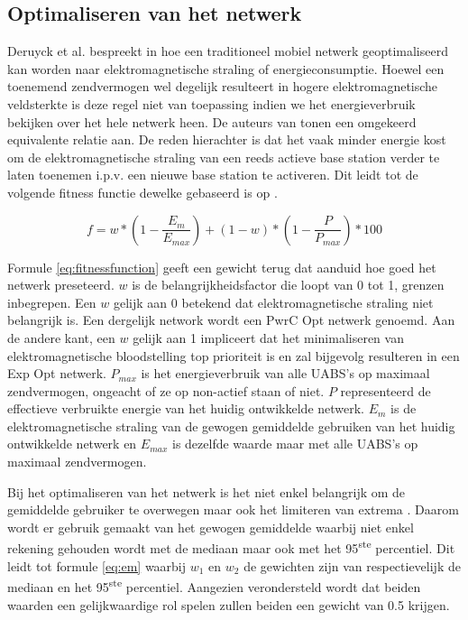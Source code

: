 \documentclass[twocolumn]{phdsymp_dutch}
\begin{document}
\subsection{Optimaliseren van het netwerk}

Deruyck et al. bespreekt in \cite{J1} hoe een traditioneel mobiel netwerk geoptimaliseerd kan worden naar elektromagnetische straling of energieconsumptie.
Hoewel een toenemend zendvermogen wel degelijk resulteert in hogere elektromagnetische veldsterkte is deze regel niet van 
toepassing indien we het energieverbruik bekijken over het hele netwerk heen. 
De auteurs van \cite{J1} tonen een omgekeerd equivalente relatie aan.
De reden hierachter is dat het vaak minder energie kost om de elektromagnetische straling van een reeds actieve base station 
verder te laten toenemen i.p.v.  een nieuwe base station te activeren. Dit leidt tot de volgende fitness functie dewelke
gebaseerd is op \cite{J1}.

\begin{equation} 
f = w * \left(1 - \frac{E_m}{E_{max}}\right) + (1 - w)*\left(1 - \frac{P}{P_{max}}\right) * 100
\label{eq:fitnessfunction}
\end{equation}

Formule \ref{eq:fitnessfunction} geeft een gewicht terug dat aanduid hoe goed het netwerk preseteerd.
$w$ is de belangrijkheidsfactor die loopt van 0 tot 1, grenzen inbegrepen. Een $w$ gelijk aan 0 betekend
dat elektromagnetische straling niet belangrijk is. Een dergelijk network wordt een \gls{PwrC Opt} netwerk genoemd.
Aan de andere kant, een $w$ gelijk aan 1 impliceert dat het minimaliseren van elektromagnetische bloodstelling top prioriteit is
en zal bijgevolg resulteren in een \gls{Exp Opt} netwerk. $P_{max}$ is het energieverbruik van alle \gls{UABS}'s op maximaal 
zendvermogen, ongeacht of ze 
op non-actief staan of niet.
$P$ representeerd de effectieve verbruikte energie van het huidig ontwikkelde netwerk.
$E_m$ is de elektromagnetische straling van de gewogen gemiddelde gebruiken van het huidig ontwikkelde netwerk en 
$E_{max}$ is dezelfde waarde maar met alle \gls{UABS}'s op maximaal zendvermogen.

Bij het optimaliseren van het netwerk is het niet enkel belangrijk om  de gemiddelde gebruiker te overwegen maar ook het limiteren 
van extrema \cite{J1}. 
Daarom wordt er gebruik gemaakt van het gewogen gemiddelde waarbij niet enkel rekening gehouden wordt met de mediaan maar ook 
met het 95\textsuperscript{ste} percentiel. Dit leidt tot formule \ref{eq:em} waarbij 
  $w_1$ en  $w_2$ de gewichten zijn van respectievelijk de mediaan en het 95\textsuperscript{ste} percentiel.
 Aangezien verondersteld wordt dat beiden waarden een gelijkwaardige rol spelen zullen beiden een gewicht van 0.5 krijgen. 
\end{document}
